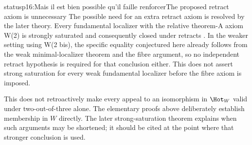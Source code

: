 \begin{dcomment}{status}{p16:Mais il est bien possible qu'il faille renforcer}{The proposed retract axiom is unnecessary}
The possible need for an extra retract axiom is resolved by the later theory. Every fundamental localizer with the relative theorem-A axiom W(2) is strongly saturated and consequently closed under retracts \citep[Proposition~4.2.4]{Cisinski2006}. In the weaker setting using W(2 bis), the specific equality conjectured here already follows from the weak minimal-localizer theorem and the fibre argument, so no independent retract hypothesis is required for that conclusion either. This does not assert strong saturation for every weak fundamental localizer before the fibre axiom is imposed.

This does not retroactively make every appeal to an isomorphism in \(\Hot_W\) valid under two-out-of-three alone. The elementary proofs above deliberately establish membership in \(W\) directly. The later strong-saturation theorem explains when such arguments may be shortened; it should be cited at the point where that stronger conclusion is used.
\end{dcomment}

